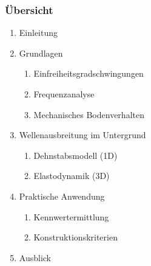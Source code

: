 \documentclass[hyperref={pdfpagemode=FullScreen, colorlinks=false}]{beamer}
\begin{document}
\begin{frame}
 \frametitle{Übersicht}
 \begin{enumerate}
  \item Einleitung
  \item Grundlagen
  \begin{enumerate}
  \item Einfreiheitsgradschwingungen %
  \item Frequenzanalyse %
  \item Mechanisches Bodenverhalten %
  \end{enumerate}
  \item Wellenausbreitung im Untergrund
  \begin{enumerate}
  \item Dehnstabsmodell (1D)
  \item Elastodynamik (3D) %
  \end{enumerate}
  \item Praktische Anwendung
  \begin{enumerate}
  \item Kennwertermittlung %
  \item Konstruktionskriterien %
  \end{enumerate}
  \item Ausblick
  \end{enumerate}

  
  
\end{frame}
\end{document}
